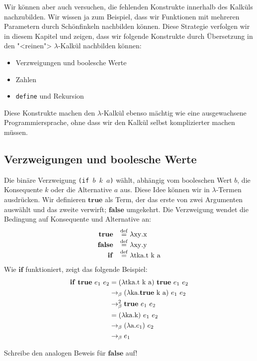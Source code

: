 Wir können aber auch versuchen, die fehlenden Konstrukte innerhalb des
Kalküls nachzubilden.  Wir wissen ja zum Beispiel, dass wir Funktionen
mit mehreren Parametern durch Schönfinkeln nachbilden können.  Diese
Strategie verfolgen wir in diesem Kapitel und zeigen, dass wir
folgende Konstrukte durch Übersetzung in den "<reinen">
$\lambda$-Kalkül nachbilden können:
%
\begin{itemize}
\item Verzweigungen und boolesche Werte
\item Zahlen
\item \lstinline{define} und Rekursion
\end{itemize}
%
Diese Konstrukte machen den $\lambda$-Kalkül ebenso mächtig wie eine
ausgewachsene Programmiersprache, ohne dass wir den Kalkül selbst
komplizierter machen müssen.

\subsection{Verzweigungen und boolesche Werte}
\label{sec:booleans}
%
Die binäre Verzweigung 
\texttt{(if \(b\) \(k\) \(a\))} wählt, abhängig vom
booleschen Wert $b$, die Konsequente
$k$ oder die Alternative $a$ aus.
Diese Idee können wir in $\lambda$-Termen ausdrücken.
Wir definieren $\mathbf{true}$ als Term,
der das erste von zwei Argumenten auswählt und das zweite verwirft;
$\mathbf{false}$ umgekehrt.
Die Verzweigung wendet die Bedingung
auf Konsequente und Alternative an:
%
\begin{displaymath}
\begin{array}{rl}
  \mathbf{true} & \stackrel{\rm def}{=}{} \lambda \mathrm x \mathrm y.\mathrm x \\
  \mathbf{false} & \stackrel{\rm def}{=}{} \lambda \mathrm x \mathrm y.\mathrm y\\
  \mathbf{if} & \stackrel{\rm def}{=}{} \lambda \mathrm t \mathrm k \mathrm a.\mathrm t~\mathrm k~\mathrm a
\end{array}
\end{displaymath}
% 
Wie $\mathbf{if}$ funktioniert,
zeigt das folgende Beispiel:
%
\begin{displaymath}
  \begin{split}
    \mathbf{if}~\mathbf{true}~e_1~e_2 & =
    (\lambda \mathrm t \mathrm k \mathrm a.\mathrm t~\mathrm k~\mathrm a)~\mathbf{true}~e_1~e_2
    \\
    & \rightarrow_\beta (\lambda \mathrm k \mathrm a.\mathbf{true}~\mathrm k~\mathrm a)~e_1~e_2\\
    & \rightarrow_\beta^2 \mathbf{true}~e_1~e_2\\
    & = (\lambda \mathrm k \mathrm a.\mathrm k)~e_1~e_2\\
    & \rightarrow_\beta (\lambda \mathrm a.e_1)~e_2\\
    & \rightarrow_\beta e_1  \end{split}
\end{displaymath}
%
\begin{aufgabeinline}
  Schreibe den analogen Beweis für $\mathbf{false}$ auf!
\end{aufgabeinline}


